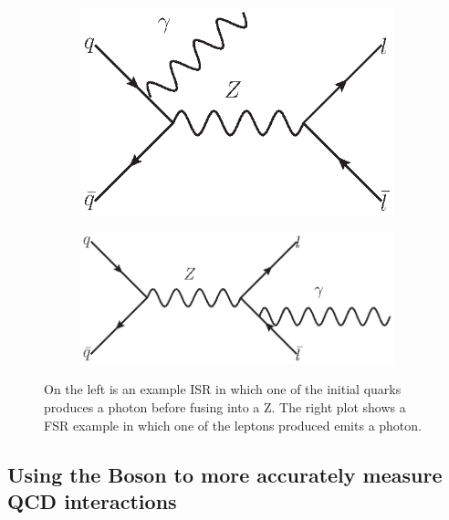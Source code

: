 \begin{figure}[!p]
    \centering
    \begin{subfigure}[b]{\SideBySidePlotWidth}
    \includegraphics[width=\linewidth]{figures/TheoryFigures/ISRExample.eps}
    \caption{}
    \end{subfigure}%
        \begin{subfigure}[b]{\SideBySidePlotWidth}
    \includegraphics[width=1.1\linewidth]{figures/TheoryFigures/FSRExample.eps}
    \caption{}
    \end{subfigure}%
    \caption[FSR and ISR example]{On the left is an example ISR in which one of the initial quarks produces a photon before fusing into a Z. The right plot shows a FSR example in which one of the leptons produced emits a photon.}
    \label{fig:ISRFSR}
\end{figure}
 \subsection{Using the \Z Boson to more accurately measure QCD interactions}

